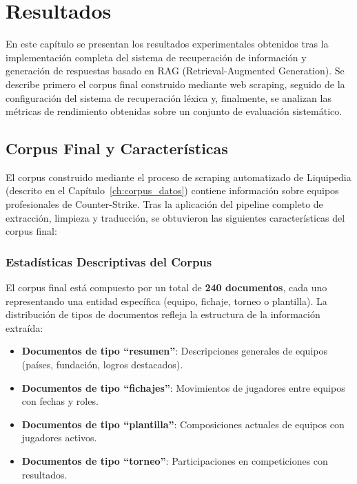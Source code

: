 ﻿\chapter{Resultados}
\label{ch:resultados}

En este capítulo se presentan los resultados experimentales obtenidos tras la implementación completa del sistema de recuperación de información y generación de respuestas basado en RAG (Retrieval-Augmented Generation). Se describe primero el corpus final construido mediante web scraping, seguido de la configuración del sistema de recuperación léxica y, finalmente, se analizan las métricas de rendimiento obtenidas sobre un conjunto de evaluación sistemático.

\section{Corpus Final y Características}

El corpus construido mediante el proceso de scraping automatizado de Liquipedia (descrito en el Capítulo~\ref{ch:corpus_datos}) contiene información sobre equipos profesionales de Counter-Strike. Tras la aplicación del pipeline completo de extracción, limpieza y traducción, se obtuvieron las siguientes características del corpus final:

\subsection{Estadísticas Descriptivas del Corpus}

El corpus final está compuesto por un total de \textbf{240 documentos}, cada uno representando una entidad específica (equipo, fichaje, torneo o plantilla). La distribución de tipos de documentos refleja la estructura de la información extraída:

\begin{itemize}
    \item \textbf{Documentos de tipo ``resumen''}: Descripciones generales de equipos (países, fundación, logros destacados).
    \item \textbf{Documentos de tipo ``fichajes''}: Movimientos de jugadores entre equipos con fechas y roles.
    \item \textbf{Documentos de tipo ``plantilla''}: Composiciones actuales de equipos con jugadores activos.
    \item \textbf{Documentos de tipo ``torneo''}: Participaciones en competiciones con resultados.
\end{itemize}

